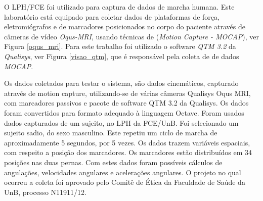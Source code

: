 O LPH/FCE foi utilizado para captura de dados de marcha humana. 
Este laboratório está equipado para coletar dados de plataformas de força, eletromiógrafos e de marcadores posicionados no corpo do paciente através de câmeras de vídeo \emph{Oqus-MRI}, usando técnicas de (\emph{Motion Capture - MOCAP}), ver Figura \ref{oqus_mri}. 
Para este trabalho foi utilizado o software \emph{QTM 3.2} da \emph{Qualisys}, ver Figura \ref{visao_qtm}, que é responsável pela coleta de de dados \emph{MOCAP}. 

Os dados coletados para testar o sistema, são
dados cinemáticos, capturado através de motion capture,
utilizando-se de várias câmeras Qualisys Oqus MRI,
com marcadores passivos e pacote de software QTM 3.2
da Qualisys. Os dados foram convertidos para formato
adequado à linguagem Octave. Foram usados dados
capturados de um sujeito, no LPH da FCE/UnB.
Foi selecionado um sujeito sadio, do sexo masculino.
Este repetiu um ciclo de marcha de aproximadamente 5
segundos, por 5 vezes. Os dados trazem variáveis
espaciais, com respeito a posição dos marcadores. Os
marcadores estão distribuídos em 34 posições nas duas
pernas. Com estes
dados foram possíveis cálculos de angulações,
velocidades angulares e acelerações angulares. 
O projeto no qual ocorreu a coleta foi aprovado
pelo Comitê de Ética da Faculdade de Saúde da UnB,
processo N11911/12.
